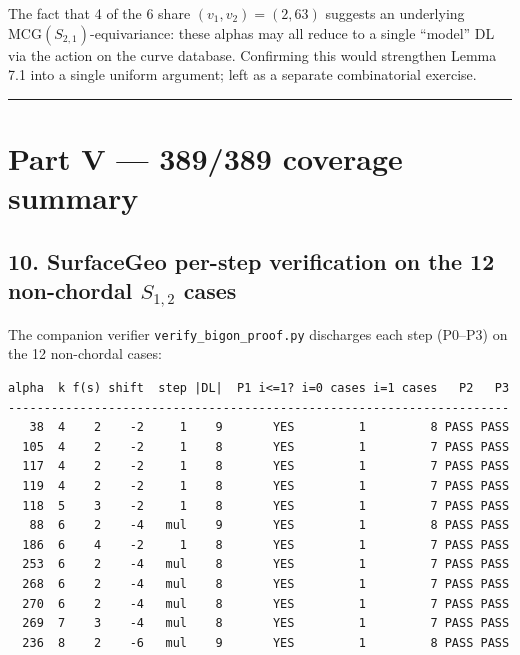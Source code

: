 \documentclass[
]{article}
\begin{document}
The fact that 4 of the 6 share \((v_1, v_2) = (2, 63)\) suggests an
underlying \(\mathrm{MCG}(S_{2,1})\)-equivariance: these alphas may all
reduce to a single ``model'' DL via the action on the curve database.
Confirming this would strengthen Lemma 7.1 into a single uniform
argument; left as a separate combinatorial exercise.

\begin{center}\rule{0.5\linewidth}{0.5pt}\end{center}

\section{Part V --- 389/389 coverage
summary}\label{part-v-389389-coverage-summary}

\subsection{\texorpdfstring{10. SurfaceGeo per-step verification on the
12 non-chordal \(S_{1,2}\)
cases}{10. SurfaceGeo per-step verification on the 12 non-chordal S\_\{1,2\} cases}}\label{surfacegeo-per-step-verification-on-the-12-non-chordal-s_12-cases}

The companion verifier \texttt{verify\_bigon\_proof.py} discharges each
step (P0--P3) on the 12 non-chordal cases:

\begin{verbatim}
alpha  k f(s) shift  step |DL|  P1 i<=1? i=0 cases i=1 cases   P2   P3
----------------------------------------------------------------------
   38  4    2    -2     1    9       YES         1         8 PASS PASS
  105  4    2    -2     1    8       YES         1         7 PASS PASS
  117  4    2    -2     1    8       YES         1         7 PASS PASS
  119  4    2    -2     1    8       YES         1         7 PASS PASS
  118  5    3    -2     1    8       YES         1         7 PASS PASS
   88  6    2    -4   mul    9       YES         1         8 PASS PASS
  186  6    4    -2     1    8       YES         1         7 PASS PASS
  253  6    2    -4   mul    8       YES         1         7 PASS PASS
  268  6    2    -4   mul    8       YES         1         7 PASS PASS
  270  6    2    -4   mul    8       YES         1         7 PASS PASS
  269  7    3    -4   mul    8       YES         1         7 PASS PASS
  236  8    2    -6   mul    9       YES         1         8 PASS PASS
\end{verbatim}
\end{document}
